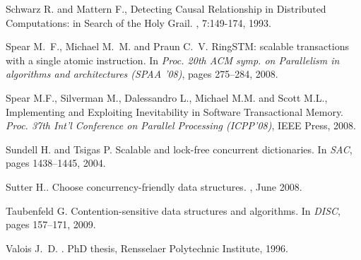 \begin{thebibliography}{99}
{%
% 
% 
% 
% 
% 



Schwarz R. and Mattern F., 
\newblock Detecting  Causal Relationship in Distributed  Computations: in  Search of
the Holy Grail. 
, 7:149-174, 1993. 


Spear M.~F., Michael M.~M. and Praun C.~V.
\newblock RingSTM: scalable transactions with a single atomic instruction.
\newblock In {\em Proc. 20th ACM symp. on Parallelism in algorithms and architectures (SPAA '08)}, pages 275--284, 2008. 


Spear M.F., Silverman M., Dalessandro L., Michael M.M.  and Scott M.L., 
Implementing and Exploiting Inevitability in Software Transactional Memory.
{\it Proc. 37th Int'l Conference on Parallel Processing (ICPP'08)}, 
IEEE Press, 2008. 


Sundell H. and Tsigas P.
\newblock Scalable and lock-free concurrent dictionaries.
\newblock In {\em SAC}, pages 1438--1445, 2004.



Sutter H..
\newblock Choose concurrency-friendly data structures.
, June 2008.


Taubenfeld G.
\newblock Contention-sensitive data structures and algorithms.
\newblock In {\em DISC}, pages 157--171, 2009.




Valois J.~D.
.
\newblock PhD thesis, Rensselaer Polytechnic Institute, 1996.


}
\end{thebibliography}
